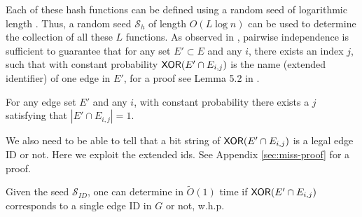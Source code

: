 Each of these hash functions can be defined using a random seed of logarithmic length \cite{TCS-010}. Thus, a 
random seed $\mathcal{S}_h$ of length $O(L \log n)$ can be used to determine the collection of all these $L$ functions. As observed in \cite{DuanConnectivityArxiv16,GibbKKT15}, pairwise independence is sufficient to guarantee that for any set $E' \subset E$ and any $i$, there exists an index $j$, such that with constant probability $\mathsf{XOR}(E' \cap E_{i,j})$ is the name (extended identifier) of one edge in $E'$, for a proof see Lemma 5.2 in  \cite{GibbKKT15}.
\begin{lemma}\label{lem:hitting-pairwise}
For any edge set $E'$ and any $i$, with constant probability there exists a $j$ satisfying that $|E' \cap E_{i,j}|=1$.
\end{lemma}


We also need to be able to tell that a bit string of $\mathsf{XOR}(E' \cap E_{i,j})$ is a legal edge ID or not. Here we exploit the extended ids. See Appendix \ref{sec:miss-proof} for a proof.
\begin{lemma} \label{lemma_unique}
Given the seed $\mathcal{S}_{ID}$, one can determine in $\widetilde{O}(1)$ time if $\mathsf{XOR}(E' \cap E_{i,j})$ corresponds to a single edge ID in $G$ or not, w.h.p.
\end{lemma}
\def\APPENDLEMMUNIQUE{
\begin{proof}[Proof of Lemma \ref{lemma_unique}]
Let $X=\XOR(E' \cap E_{i,j})$. Letting $E''=E' \cap E_{i,j}$, then $X$ can be written as the concatenation of $\XOR_1(E'')$ and $\XOR_2(E'')$, where $\XOR_1(E'')=\XOR_U(E'')$ is the bit-wise XOR of the unique identifiers $\UID(e)$ for $e \in E''$ and $\XOR_2(E'')$ is the bit-wise XOR of the remaining information in the extended identifiers of $E''$.  We now show how using the seed and $\XOR_2(E'')$, one can test the validity of $\XOR_1(E'')$.
The algorithm detects the case that $|E''| \geq 2$ as follows. First, in the case that $E''$ is a single edge, $\XOR_2(E'')$ should contain legal ids $\ID(u),\ID(v)$. If this is not the case, it follows that $|E''| \neq 1$. If $\XOR_2(E'')$ contains legal ids $\ID(u),\ID(v)$, we use them and the seed $\mathcal{S}_{ID}$ to determine $\UID(e)$ for $e = (u,v)$, and we check if $\XOR_1(E'')=\ID_1(e)$. We have two options, either $E'' = \{e\}$ is the single edge $e$, in which case $\XOR_U(E'')=\UID(e) \in \mathcal{I}$, and the verification succeeds. Otherwise $|E''| \geq 2$, in which case, from Lemma \ref{cl:epsbias}, $\Pr[\XOR_U(E'') \in \mathcal{I}] \leq 1/n^{10}$, hence w.h.p $\XOR_U(E'') \neq \UID(e) \in \mathcal{I}$ and we identify that $|E''| \geq 2$.
\end{proof}
}%

